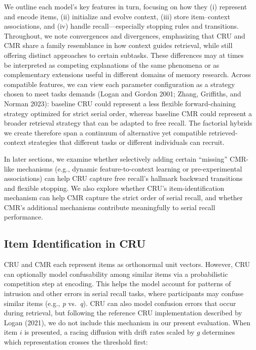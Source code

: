 \documentclass[
  letterpaper,
  11pt,
  english,
  singlespacing,
  headsepline]{MastersDoctoralThesis}
\begin{document}
We outline each model's key features in turn, focusing on how they (i)
represent and encode items, (ii) initialize and evolve context, (iii)
store item--context associations, and (iv) handle recall---especially
stopping rules and transitions. Throughout, we note convergences and
divergences, emphasizing that CRU and CMR share a family resemblance in
how context guides retrieval, while still offering distinct approaches
to certain subtasks. These differences may at times be interpreted as
competing explanations of the same phenomena or as complementary
extensions useful in different domains of memory research. Across
compatible features, we can view each parameter configuration as a
strategy chosen to meet tasks demands (Logan and Gordon 2001; Zhang,
Griffiths, and Norman 2023): baseline CRU could represent a less
flexible forward-chaining strategy optimized for strict serial order,
whereas baseline CMR could represent a broader retrieval strategy that
can be adapted to free recall. The factorial hybrids we create therefore
span a continuum of alternative yet compatible retrieved-context
strategies that different tasks or different individuals can recruit.

In later sections, we examine whether selectively adding certain
``missing'' CMR-like mechanisms (e.g., dynamic feature-to-context
learning or pre-experimental associations) can help CRU capture free
recall's hallmark backward transitions and flexible stopping. We also
explore whether CRU's item-identification mechanism can help CMR capture
the strict order of serial recall, and whether CMR's additional
mechanisms contribute meaningfully to serial recall performance.

\subsection{Item Identification in
CRU}\label{item-identification-in-cru}

CRU and CMR each represent items as orthonormal unit vectors. However,
CRU can optionally model confusability among similar items via a
probabilistic competition step at encoding. This helps the model account
for patterns of intrusion and other errors in serial recall tasks, where
participants may confuse similar items (e.g., \emph{p} vs.~\emph{q}).
CRU can also model confusion errors that occur during retrieval, but
following the reference CRU implementation described by Logan (2021), we
do not include this mechanism in our present evaluation. When item \(i\)
is presented, a racing diffusion with drift rates scaled by \(g\)
determines which representation crosses the threshold first:
\end{document}

